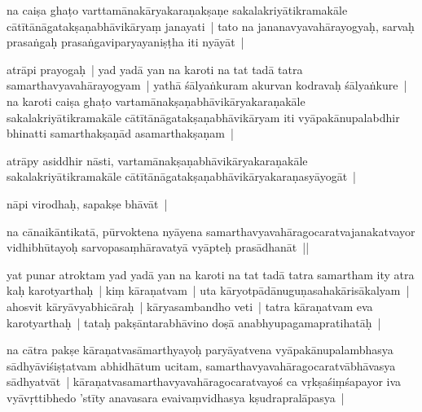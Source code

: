 \documentclass[article,12pt,a4paper]{memoir}%
\newcounter{parCount}
\begin{document}
	  \pstart \leavevmode%
	\label{thakur75-69.8}na caiṣa ghaṭo varttamānakāryakaraṇakṣaṇe sakalakriyātikramakāle cātītānāgatakṣaṇabhāvikāryaṃ janayati | tato na jananavyavahārayogyaḥ, sarvaḥ prasaṅgaḥ prasaṅgaviparyayaniṣṭha iti nyāyāt |
	{}
	\pend%
      

	  \pstart \leavevmode%
	\label{thakur75-69.11}atrāpi prayogaḥ | yad yadā yan na karoti na tat tadā tatra samarthavyavahārayogyam | yathā śālyaṅkuram akurvan kodravaḥ śālyaṅkure | na karoti caiṣa ghaṭo vartamānakṣaṇabhāvikāryakaraṇakāle sakalakriyātikramakāle cātītānāgatakṣaṇabhāvikāryam iti vyāpakānupalabdhir bhinatti samarthakṣaṇād asamarthakṣaṇam |
	{}
	\pend%
      

	  \pstart \leavevmode%
	\label{thakur75-69.15}atrāpy asiddhir nāsti, vartamānakṣaṇabhāvikāryakaraṇakāle sakalakriyātikramakāle cātītānāgatakṣaṇabhāvikāryakaraṇasyāyogāt |
	{}
	\pend%
      

	  \pstart \leavevmode%
	\label{thakur75-69.17}nāpi virodhaḥ, sapakṣe bhāvāt |
	{}
	\pend%
      

	  \pstart \leavevmode%
	\label{thakur75-69.18}na cānaikāntikatā, pūrvoktena nyāyena samarthavyavahāragocaratvajanakatvayor vidhibhūtayoḥ sarvopasaṃhāravatyā vyāpteḥ prasādhanāt ||
	{}
	\pend%
      

	  \pstart \leavevmode%
	\label{thakur75-69.20}yat punar atroktam yad yadā yan na karoti na tat tadā tatra samartham ity atra kaḥ karotyarthaḥ | kiṃ kāraṇatvam | uta kāryotpādānuguṇasahakārisākalyam | ahosvit kāryāvyabhicāraḥ | kāryasambandho veti | tatra kāraṇatvam eva karotyarthaḥ | tataḥ pakṣāntarabhāvino doṣā anabhyupagamapratihatāḥ |
	{}
	\pend%
      

	  \pstart \leavevmode%
	\label{thakur75-69.24}na cātra pakṣe kāraṇatvasāmarthyayoḥ paryāyatvena vyāpakānupalambhasya sādhyāviśiṣṭatvam abhidhātum ucitam, samarthavyavahāragocaratvābhāvasya sādhyatvāt | kāraṇatvasamarthavyavahāragocaratvayoś ca vṛkṣaśiṃśapayor iva vyāvṛttibhedo 'stīty anavasara evaivaṃvidhasya kṣudrapralāpasya |
	{}
	\pend%
      
\end{document}
